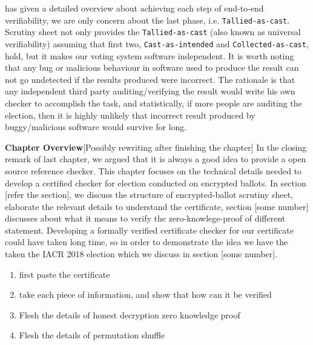 \cite{Benaloh:2006:SVE:1251003.1251008} has given a detailed overview  about achieving each step of 
end-to-end verifiability, we are only concern about the last phase, i.e. \texttt{Tallied-as-cast}.
Scrutiny sheet not only provides the \texttt{Tallied-as-cast}
(also known as universal verifiability) assuming that first two, \texttt{Cast-as-intended} and 
\texttt{Collected-as-cast}, hold, but it makes our voting system  software independent. 
It is worth noting that any bug or malicious behaviour in 
software used to produce the result can not go undetected if the results produced were incorrect. The 
rationale is that any independent third party auditing/verifying the result would
write his own checker to accomplish the task, and statistically, if more people are auditing the election, then 
it is highly unlikely that incorrect result produced by buggy/malicious software would survive for long. 



\textbf{Chapter Overview}[Possibly rewriting after finishing the chapter]
In the closing remark of last chapter, we argued that it is always a good idea to provide a open source 
reference checker. This chapter focuses on the technical details needed to develop a certified checker 
for election conducted on encrypted ballots. 
In section [refer the section], we discuss the structure of  encrypted-ballot scrutiny sheet, 
elaborate the relevant details to understand the certificate, section [some number] discusses 
about what it means to verify the zero-knowlege-proof of different statement. Developing a 
formally verified certificate checker for our certificate could have taken long time, so in order 
to demonstrate the idea we have the taken the IACR 2018 election which we discuss in section [some number].
%

\begin{enumerate}
\item first paste the certificate
\item take each piece of information, and show that how can it be verified
\item Flesh the details of honest decryption zero knowledge proof
\item Flesh the details of permutation shuffle
\end{enumerate}

